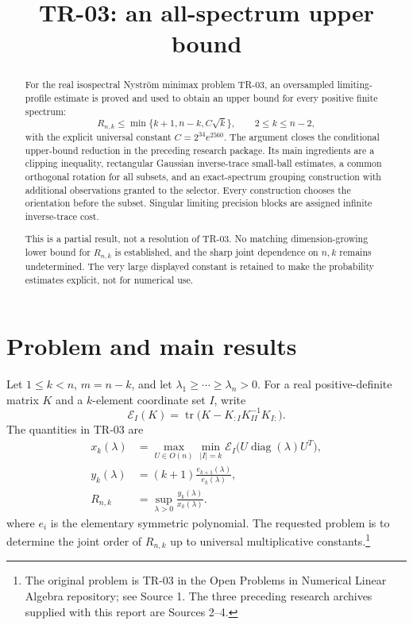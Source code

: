 \documentclass[11pt]{article}
\title{TR-03: an all-spectrum upper bound}
\author{}\date{}
\theoremstyle{remark}\newtheorem{remark}[theorem]{Remark}
\newcommand{\tr}{\operatorname{tr}}
\newcommand{\diag}{\operatorname{diag}}
\newcommand{\Err}{\mathcal E}
\begin{document}
\maketitle
\begin{abstract}
For the real isospectral Nystr\"om minimax problem TR-03, an oversampled limiting-profile estimate is proved and used to obtain an upper bound for every positive finite spectrum:
\[
 R_{n,k}\le \min\{k+1,n-k,C\sqrt{k}\},\qquad 2\le k\le n-2,
\]
with the explicit universal constant $C=2^{34}e^{2560}$. The argument closes the conditional upper-bound reduction in the preceding research package. Its main ingredients are a clipping inequality, rectangular Gaussian inverse-trace small-ball estimates, a common orthogonal rotation for all subsets, and an exact-spectrum grouping construction with additional observations granted to the selector. Every construction chooses the orientation before the subset. Singular limiting precision blocks are assigned infinite inverse-trace cost.

This is a partial result, not a resolution of TR-03. No matching dimension-growing lower bound for $R_{n,k}$ is established, and the sharp joint dependence on $n,k$ remains undetermined. The very large displayed constant is retained to make the probability estimates explicit, not for numerical use.
\end{abstract}
\tableofcontents
\newpage

\section{Problem and main results}
Let $1\le k<n$, $m=n-k$, and let $\lambda_1\ge\cdots\ge\lambda_n>0$. For a real positive-definite matrix $K$ and a $k$-element coordinate set $I$, write
\[
 \Err_I(K)=\tr\bigl(K-K_{:I}K_{II}^{-1}K_{I:}\bigr).
\]
The quantities in TR-03 are
\begin{align*}
 x_k(\lambda)&=\max_{U\in O(n)}\min_{|I|=k}
 \Err_I\bigl(U\diag(\lambda)U^T\bigr),\\
 y_k(\lambda)&=(k+1)\frac{e_{k+1}(\lambda)}{e_k(\lambda)},\\
 R_{n,k}&=\sup_{\lambda>0}\frac{y_k(\lambda)}{x_k(\lambda)}.
\end{align*}
where $e_i$ is the elementary symmetric polynomial. The requested problem is to determine the joint order of $R_{n,k}$ up to universal multiplicative constants.\footnote{The original problem is TR-03 in the Open Problems in Numerical Linear Algebra repository; see Source 1. The three preceding research archives supplied with this report are Sources 2--4.}
\end{document}
